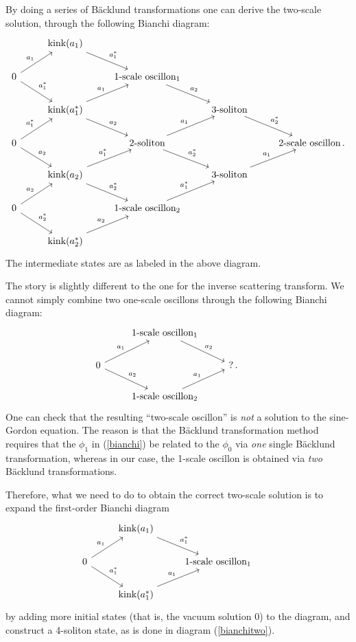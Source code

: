 \documentclass[11pt]{book}
\begin{document}
By doing a series of B\"acklund transformations one can derive the two-scale solution, through the following Bianchi diagram:
\begin{equation}\label{bianchitwo}
\begin{tikzcd}
  & \text{kink}(a_1) \arrow{dr}{a_1^*} &&\\
 0 \arrow{ur}{a_1} \arrow{dr}{a_1^*} & &\text{1-scale oscillon}_1\arrow{dr}{a_2}&\\
  & \text{kink}(a_1^*) \arrow{ur}{a_1} \arrow{dr}{a_2} && \text{3-soliton}\arrow{dr}{a_2^*}&\\
 0 \arrow{ur}{a_1^*} \arrow{dr}{a_2} &&\text{2-soliton}\arrow{ur}{a_1}\arrow{dr}{a_2^*}&&\text{2-scale oscillon\,.}\\
 &\text{kink}(a_2)\arrow{ur}{a_1^*}\arrow{dr}{a_2^*}&&\text{3-soliton}\arrow{ur}{a_1}\\
 0\arrow{ur}{a_2}\arrow{dr}{a_2^*}&&\text{1-scale oscillon}_2\arrow{ur}{a_1^*}\\
 &\text{kink}(a_2^*)\arrow{ur}{a_2}&&
\end{tikzcd}
\end{equation}
The intermediate states are as labeled in the above diagram.

The story is slightly different to the one for the inverse scattering transform. We cannot simply combine two one-scale oscillons through the following Bianchi diagram:
\[
\begin{tikzcd}
  & \text{1-scale oscillon}_1 \arrow{dr}{a_2} &&\\
  0 \arrow{ur}{a_1} \arrow{dr}{a_2} & &?\,.&\\
  &\text{1-scale oscillon}_2 \arrow{ur}{a_1}&&
\end{tikzcd}
\]
One can check that the resulting ``two-scale oscillon'' is \emph{not} a solution to the sine-Gordon equation. The reason is that the B\"acklund transformation method requires that the $\phi_1$ in (\ref{bianchi}) be related to the $\phi_0$ via \emph{one} single B\"acklund transformation, whereas in our case, the 1-scale oscillon is obtained via \emph{two} B\"acklund transformations.

Therefore, what we need to do to obtain the correct two-scale solution is to expand the first-order Bianchi diagram
\[
\begin{tikzcd}
  & \text{kink}(a_1) \arrow{dr}{a_1^*} &&\\
 0 \arrow{ur}{a_1} \arrow{dr}{a_1^*} & &\text{1-scale oscillon}_1&\\
   & \text{kink}(a_1^*) \arrow{ur}{a_1} &&
\end{tikzcd}
\]
by adding more initial states (that is, the vacuum solution $0$) to the diagram, and construct a 4-soliton state, as is done in diagram (\ref{bianchitwo}).
\end{document}
